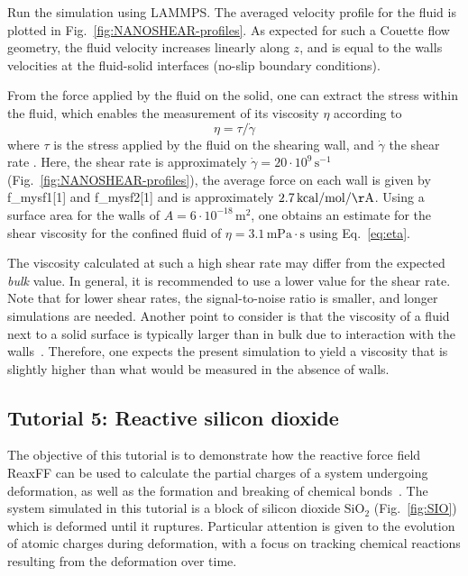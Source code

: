 \documentclass[9pt,tutorial]{livecoms}
\newcommand{\lmpcmd}[1]{\colorbox{listing}{\textcolor{command}{\small{#1}}}} %
\begin{document}
Run the simulation using LAMMPS.  The averaged velocity
profile for the fluid is plotted in Fig.~\ref{fig:NANOSHEAR-profiles}.
As expected for such a Couette flow geometry, the fluid velocity increases
linearly along $z$, and is equal to the walls velocities at the fluid-solid
interfaces (no-slip boundary conditions).

From the force applied by the fluid on the solid, one can extract the stress
within the fluid, which enables the measurement of its viscosity $\eta$
according to
\begin{equation}
\eta = \tau / \dot{\gamma}
\label{eq:eta}
\end{equation}
where $\tau$ is the stress applied by
the fluid on the shearing wall, and $\dot{\gamma}$ the shear rate
\cite{gravelle2021violations}.  Here, the shear rate is
approximately $\dot{\gamma} = 20 \cdot 10^9\,\text{s}^{-1}$ (Fig.~\ref{fig:NANOSHEAR-profiles}),
the average force on each wall is given by \lmpcmd{f\_mysf1[1]} and \lmpcmd{f\_mysf2[1]}
and is approximately $2.7\,\mathrm{kcal/mol/\AA{}}$. %
Using a surface area
for the walls of $A = 6 \cdot 10^{-18}\,\text{m}^2$, one obtains an estimate for
the shear viscosity for the confined fluid of $\eta = 3.1\,\mathrm{mPa\cdot s}$ using Eq.~\eqref{eq:eta}.

\begin{note}
  The viscosity calculated at such a high shear rate may differ from the expected
  \emph{bulk} value.  In general, it is recommended to use a lower value for the
  shear rate.  Note that for lower shear rates, the signal-to-noise ratio is
  smaller, and longer simulations are needed.  Another point to consider
  is that the viscosity of a fluid next to a solid surface is typically larger
  than in bulk due to interaction with the walls~\cite{wolde-kidanInterplayInterfacialViscosity2021}.
  Therefore, one expects the present simulation to yield a viscosity that is slightly
  higher than what would be measured in the absence of walls.
\end{note}

\subsection{Tutorial 5: Reactive silicon dioxide}
\label{reactive-silicon-dioxide-label}

The objective of this tutorial is to demonstrate how the reactive force field ReaxFF
can be used to calculate the partial charges of a system undergoing deformation, as well as
the formation and breaking of chemical bonds~\cite{van2001reaxff, zou2012investigation}.
The system simulated in this tutorial is a block of silicon dioxide $\text{SiO}_2$ (Fig.~\ref{fig:SIO})
which is deformed until it ruptures.  Particular attention is given to the evolution
of atomic charges during deformation, with a focus on tracking chemical reactions
resulting from the deformation over time.
\end{document}
